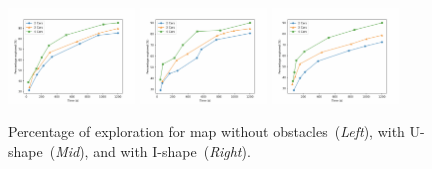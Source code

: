 \begin{figure}[t]
\includegraphics[width=0.3\textwidth]{figs/exp-empty.png}
\includegraphics[width=0.3\textwidth]{figs/exp-u-shape.png}
\includegraphics[width=0.3\textwidth]{figs/exp-i-shape.png}
\caption{Percentage of exploration for map without obstacles~(\emph{Left}), with U-shape~(\emph{Mid}), and with I-shape~(\emph{Right}).}\label{fig:percent}
\end{figure}

